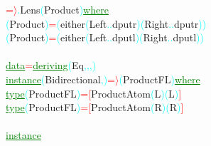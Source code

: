 \textcolor{red}{=\ensuremath{\rangle}}\textcolor{cyan}{.}{\rm{}Lens}\hsspace \textcolor{cyan}{(}{\rm{}Product}\textcolor{cyan}{)}\hsspace \textcolor{green}{\underline{where}}\\\hsspace \textcolor{cyan}{(}{\rm{}Product}\textcolor{cyan}{)}\hsspace \textcolor{red}{=}\hsspace \textcolor{cyan}{(}{\rm{}either}\hsspace \textcolor{cyan}{(}{\rm{}Left}\hsspace \textcolor{cyan}{.}\textcolor{cyan}{.}{\rm{}dputr}\textcolor{cyan}{)}\hsspace \textcolor{cyan}{(}{\rm{}Right}\hsspace \textcolor{cyan}{.}\textcolor{cyan}{.}{\rm{}dputr}\textcolor{cyan}{)}\textcolor{cyan}{)}\\\hsspace \textcolor{cyan}{(}{\rm{}Product}\textcolor{cyan}{)}\hsspace \textcolor{red}{=}\hsspace \textcolor{cyan}{(}{\rm{}either}\hsspace \textcolor{cyan}{(}{\rm{}Left}\hsspace \textcolor{cyan}{.}\textcolor{cyan}{.}{\rm{}dputl}\textcolor{cyan}{)}\hsspace \textcolor{cyan}{(}{\rm{}Right}\hsspace \textcolor{cyan}{.}\textcolor{cyan}{.}{\rm{}dputl}\textcolor{cyan}{)}\textcolor{cyan}{)}\\\\\textcolor{green}{\underline{data}}\hsspace \textcolor{red}{=}\hsspace \textcolor{green}{\underline{deriving}}\hsspace \textcolor{cyan}{(}{\rm{}Eq}\textcolor{cyan}{,}\textcolor{cyan}{,}\textcolor{cyan}{,}\textcolor{cyan}{)}\\\textcolor{green}{\underline{instance}}\hsspace \textcolor{cyan}{(}{\rm{}Bidirectional}\textcolor{cyan}{,}\textcolor{cyan}{)}\hsspace \textcolor{red}{=\ensuremath{\rangle}}\hsspace \textcolor{cyan}{(}{\rm{}ProductFL}\textcolor{cyan}{)}\hsspace \textcolor{green}{\underline{where}}\\\hstab \textcolor{green}{\underline{type}}\hsspace \textcolor{cyan}{(}{\rm{}ProductFL}\textcolor{cyan}{)}\hsspace \textcolor{red}{=}\hsspace \textcolor{red}{[}{\rm{}ProductAtom}\hsspace \textcolor{cyan}{(}{\rm{}L}\textcolor{cyan}{)}\hsspace \textcolor{cyan}{(}{\rm{}L}\textcolor{cyan}{)}\textcolor{red}{]}\\\hstab \textcolor{green}{\underline{type}}\hsspace \textcolor{cyan}{(}{\rm{}ProductFL}\textcolor{cyan}{)}\hsspace \textcolor{red}{=}\hsspace \textcolor{red}{[}{\rm{}ProductAtom}\hsspace \textcolor{cyan}{(}{\rm{}R}\textcolor{cyan}{)}\hsspace \textcolor{cyan}{(}{\rm{}R}\textcolor{cyan}{)}\textcolor{red}{]}\\\\\textcolor{green}{\underline{instance}}\hsspace 